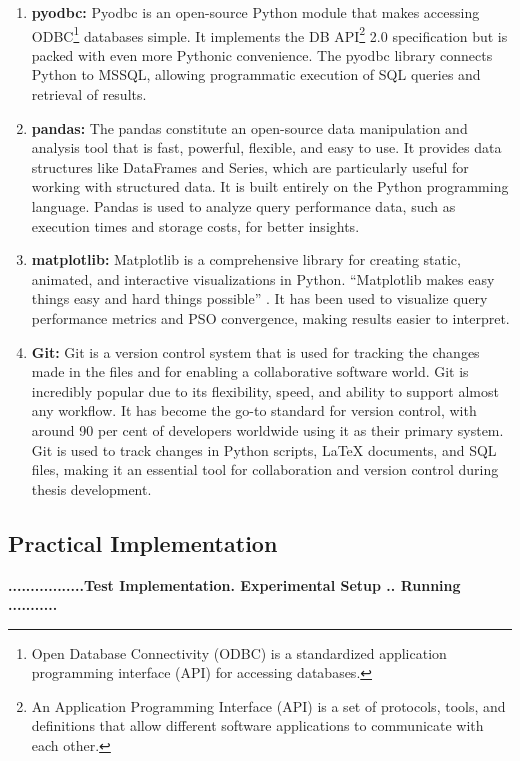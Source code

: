 \begin{enumerate}[label=(\roman*)]
\item\textbf{pyodbc:} Pyodbc is an open-source Python module that makes accessing ODBC\footnote{Open Database Connectivity (ODBC) is a standardized application programming interface (API) for accessing databases.} databases simple. It implements the DB API\footnote{An Application Programming Interface (API) is a set of protocols, tools, and definitions that allow different software applications to communicate with each other.} 2.0 specification but is packed with even more Pythonic convenience. The pyodbc library connects Python to MSSQL, allowing programmatic execution of SQL queries and retrieval of results.

\item\textbf{pandas:} The pandas constitute an open-source data manipulation and analysis tool that is fast, powerful, flexible, and easy to use. It provides data structures like DataFrames and Series, which are particularly useful for working with structured data. It is built entirely on the Python programming language. Pandas is used to analyze query performance data, such as execution times and storage costs, for better insights.

\item\textbf{matplotlib:} Matplotlib is a comprehensive library for creating static, animated, and interactive visualizations in Python. \enquote{Matplotlib makes easy things easy and hard things possible} \cite{matplotlib}. It has been used to visualize query performance metrics and PSO convergence, making results easier to interpret.

\item\textbf{Git:} Git is a version control system that is used for tracking the changes made in the files and for enabling a collaborative software world. Git is incredibly popular due to its flexibility, speed, and ability to support almost any workflow. It has become the go-to standard for version control, with around 90 per cent of developers worldwide using it as their primary system. Git is used to track changes in Python scripts, LaTeX documents, and SQL files, making it an essential tool for collaboration and version control during thesis development.

\end{enumerate}

\clearpage

\subsection{Practical Implementation }
 \begin{center}
     \textbf{.................Test Implementation.
     Experimental Setup
     .. Running ...........}
 \end{center}
